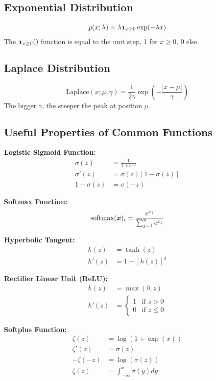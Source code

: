 \begin{multicols}{2}
	\subsection{Exponential Distribution}
	\[ p(x;\lambda) = \lambda \bol{1}_{x\ge 0} \exp(-\lambda x) \]
	The $\bol{1}_{x\ge 0}()$ function is equal to the unit step, 1 for $x\ge 0$, 0 else.
	
	\subsection{Laplace Distribution}
	\[ \text{Laplace}(x;\mu,\gamma)=\frac{1}{2\gamma}\exp\left( -\frac{\lvert x-\mu \rvert }{\gamma} \right) \]
	The bigger $\gamma$, the steeper the peak at position $\mu$.
	
	\subsection{Useful Properties of Common Functions}
	\textbf{Logistic Sigmoid Function:}
	\begin{align*}
	\sigma(z) &= \frac{1}{1+e^{-z}}\\
	\sigma'(z)&= \sigma(z)\left[ 1-\sigma(z) \right]\\
	1-\sigma(z) &= \sigma(-z)
	\end{align*}
	
	\textbf{Softmax Function:}
	\begin{align*}
	\text{softmax}(\bol{x})_i = \frac{e^{x_i}}{\sum_{j=1}^{n}e^{x_j}}
	\end{align*}
	
	\textbf{Hyperbolic Tangent:}
	\begin{align*}
	h(z) &= \tanh(z)\\
	h'(z)&= 1-\left[h(z)\right]^2
	\end{align*}
	
	\textbf{Rectifier Linear Unit (ReLU):}
	\begin{align*}
	h(z) &= \max\left(0,z\right)\\
	h'(z)&= \begin{cases}
	1 & \text{if } z>0\\
	0 & \text{if } z\le 0
	\end{cases}
	\end{align*}
	
	\textbf{Softplus Function:}
	\begin{align*}
	\zeta(z) &= \log\left(1+\exp(x)\right)\\
	\zeta'(z)&= \sigma(z)\\
	-\zeta(-z) &= \log\left(\sigma(z)\right)\\
	\zeta(z) &= \int_{-\infty}^{x}\sigma(y)dy
	\end{align*}
	

\end{multicols}
